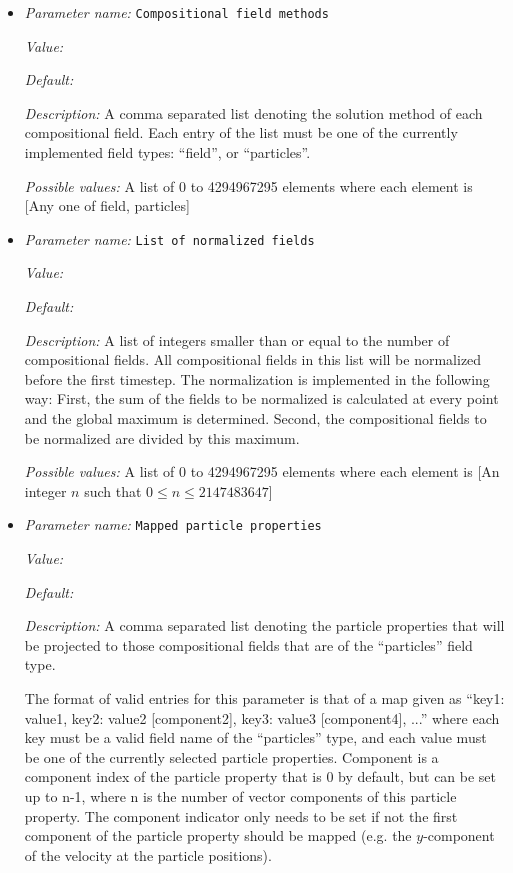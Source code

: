 \begin{itemize}
\item {\it Parameter name:} {\tt Compositional field methods}
\label{parameters:Compositional fields/Compositional field methods}


{\it Value:} 


{\it Default:} 


{\it Description:} A comma separated list denoting the solution method of each compositional field. Each entry of the list must be one of the currently implemented field types: ``field'', or ``particles''.


{\it Possible values:} A list of 0 to 4294967295 elements where each element is [Any one of field, particles]
\item {\it Parameter name:} {\tt List of normalized fields}
\label{parameters:Compositional fields/List of normalized fields}


{\it Value:} 


{\it Default:} 


{\it Description:} A list of integers smaller than or equal to the number of compositional fields. All compositional fields in this list will be normalized before the first timestep. The normalization is implemented in the following way: First, the sum of the fields to be normalized is calculated at every point and the global maximum is determined. Second, the compositional fields to be normalized are divided by this maximum.


{\it Possible values:} A list of 0 to 4294967295 elements where each element is [An integer $n$ such that $0\leq n \leq 2147483647$]
\item {\it Parameter name:} {\tt Mapped particle properties}
\label{parameters:Compositional fields/Mapped particle properties}


{\it Value:} 


{\it Default:} 


{\it Description:} A comma separated list denoting the particle properties that will be projected to those compositional fields that are of the ``particles'' field type.

The format of valid entries for this parameter is that of a map given as ``key1: value1, key2: value2 [component2], key3: value3 [component4], ...'' where each key must be a valid field name of the ``particles'' type, and each value must be one of the currently selected particle properties. Component is a component index of the particle property that is 0 by default, but can be set up to n-1, where n is the number of vector components of this particle property. The component indicator only needs to be set if not the first component of the particle property should be mapped (e.g. the $y$-component of the velocity at the particle positions).



\end{itemize}
